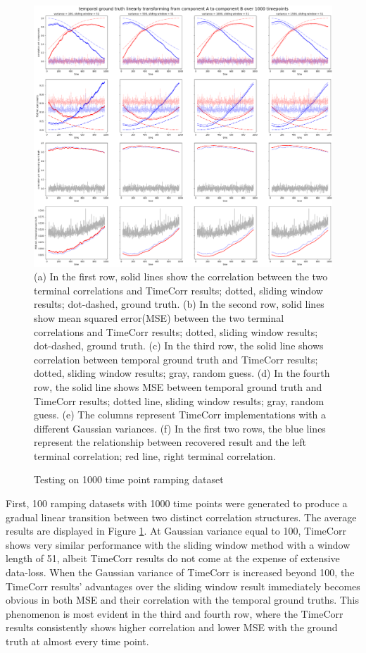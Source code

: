 \documentclass[11pt]{article}
\begin{document}
\begin{figure}[!htb]
\caption{Testing on 1000 time point ramping dataset}
\includegraphics[width=1\textwidth]{../figures/SyntheticTesting/ramp1000t4var.png}
\label{fig:ramp1000t4var}
(a) In the first row, solid lines show the correlation between the two terminal correlations and TimeCorr results; dotted, sliding window results; dot-dashed, ground truth. (b) In the second row, solid lines show mean squared error(MSE) between the two terminal correlations and TimeCorr results; dotted, sliding window results; dot-dashed, ground truth. (c) In the third row, the solid line shows correlation between temporal ground truth and TimeCorr results; dotted, sliding window results; gray, random guess. (d) In the fourth row, the solid line shows MSE between temporal ground truth and TimeCorr results; dotted line, sliding window results; gray, random guess. (e) The columns represent TimeCorr implementations with a different Gaussian variances. (f) In the first two rows, the blue lines represent the relationship between recovered result and the left terminal correlation; red line, right terminal correlation.
\end{figure}

First, 100 ramping datasets with 1000 time points were generated to produce a gradual linear transition between two distinct correlation structures. The average results are displayed in Figure \ref{fig:ramp1000t4var}. At Gaussian variance equal to 100, TimeCorr shows very similar performance with the sliding window method with a window length of 51, albeit TimeCorr results do not come at the expense of extensive data-loss. When the Gaussian variance of TimeCorr is increased beyond 100, the TimeCorr results' advantages over the sliding window result immediately becomes obvious in both MSE and their correlation with the temporal ground truths. This phenomenon is most evident in the third and fourth row, where the TimeCorr results consistently shows higher correlation and lower MSE with the ground truth at almost every time point.
\end{document}
